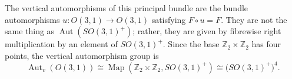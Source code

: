\documentclass[a4paper,11pt,oneside]{article}
\begin{document}
{{            The vertical automorphisms of this principal bundle are the bundle
            automorphisms \(u : O(3,1) \to O(3,1)\) satisfying
            \(F \circ u = F\). They are not the same thing as
            \(\operatorname{Aut}(SO(3,1)^+)\); rather, they are given by fibrewise
            right multiplication by an element of \(SO(3,1)^+\). Since the base
            \(\mathbb{Z}_2 \times \mathbb{Z}_2\) has four points, the vertical
            automorphism group is
            \[
                \operatorname{Aut}_v(O(3,1))
                \cong
                \operatorname{Map}(\mathbb{Z}_2 \times \mathbb{Z}_2, SO(3,1)^+)
                \cong
                \bigl(SO(3,1)^+\bigr)^4.
            \]
        }

    }
\end{document}
